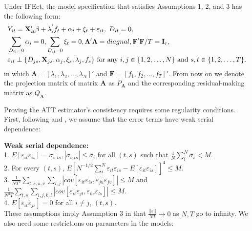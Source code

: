 \documentclass[12pt]{article}
\begin{document}
Under IFEct, the model specification that satisfies Assumptions 1, 2, and 3 has the following form:
   \begin{align}
 &  Y_{it} = \mathbf{X}_{it}'\beta + \mathbf{\lambda}_{i}^{'} f_{t} + \alpha_{i} + \xi_{t} + \varepsilon_{it},  \hspace{1mm} D_{it}=0, \\
 & \sum_{D_{it} = 0}\alpha_{i} = 0,  \sum_{D_{it} = 0} \xi_t = 0, \mathbf{\Lambda}' \mathbf{\Lambda} = diagnal, \mathbf{F}'\mathbf{F} / T = \mathbf{I}_r,  \notag \\
 & \varepsilon_{it} \perp \{D_{js}, \mathbf{X}_{js} , \alpha_{j}, \xi_{s}, \mathbf{\lambda}_{j}, f_{s}\} \text{ for any } i,j \in \{1,2,\dots,N\} \text{ and } s,t \in \{1,2,\dots,T\}. \notag
   \end{align}   
 in which $\mathbf{\Lambda} = \left[\lambda_1, \lambda_2, \hdots, \lambda_N \right]'$ and $\mathbf{F} = \left[f_1, f_2, \hdots, f_T \right]'$. 
From now on we denote the projection matrix of matrix $\mathbf{A}$ as $P_{\mathbf{A}}$  and the corresponding residual-making matrix as $Q_{\mathbf{A}}$.

Proving the ATT estimator's consistency requires some regularity conditions. First, following \citet{Bai2009} and \citet{xu2017generalized}, we assume that the error terms have weak serial dependence:

\noindent\textbf{Weak serial dependence:}\\
1. $E\left[\varepsilon_{it} \varepsilon_{is} \right] = \sigma_{i,ts}, |\sigma_{i,ts}| \leq \bar{\sigma}_i$ for all $(t,s)$ such that $\frac{1}{N}\sum_i^N \bar{\sigma}_i < M$. \\
2. For every $(t,s)$, $E\left[N^{-1/2} \sum_i^N \varepsilon_{it} \varepsilon_{is} - E\left[\varepsilon_{it} \varepsilon_{is} \right] \right]^4 \leq M$. \\
3. $\frac{1}{NT^2} \sum_{t,s,u,v}\sum_{i,j}|cov\left[\varepsilon_{it} \varepsilon_{is}, \varepsilon_{ju} \varepsilon_{jv} \right]| \leq M$ and\\
$\frac{1}{N^2T} \sum_{t,s}\sum_{i,j,k,l}|cov\left[\varepsilon_{it} \varepsilon_{jt}, \varepsilon_{ks} \varepsilon_{ls} \right]| \leq M$.\\
4. $E\left[\varepsilon_{it} \varepsilon_{js} \right] = 0$ for all $i \neq j$, $(t,s)$. \\
These assumptions imply Assumption 3 in \citet{MoonWeidner2013} that $\frac{||\varepsilon||}{NT} \rightarrow 0$ as $N, T$ go to infinity. We also need some restrictions on parameters in the models:
\end{document}
